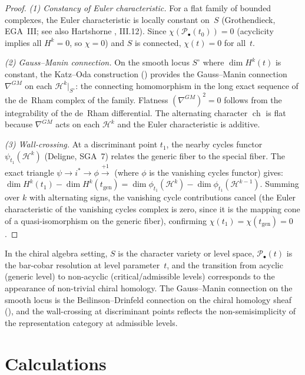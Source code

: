 \begin{proof}
\emph{(1) Constancy of Euler characteristic.}
For a flat family of bounded complexes, the Euler characteristic is
locally constant on~$S$ (Grothendieck, EGA~III; see also Hartshorne
\cite{Har77}, III.12). Since $\chi(\mathcal{P}_\bullet(t_0)) = 0$
(acyclicity implies all $H^k = 0$, so $\chi = 0$) and $S$ is connected,
$\chi(t) = 0$ for all~$t$.

\emph{(2) Gauss--Manin connection.}
On the smooth locus $S^{\circ}$ where $\dim H^k(t)$ is constant, the
Katz--Oda construction (\cite{KO68}) provides the Gauss--Manin connection
$\nabla^{GM}$ on each $\mathcal{H}^k|_{S^{\circ}}$: the connecting
homomorphism in the long exact sequence of the de~Rham complex of the
family. Flatness $(\nabla^{GM})^2 = 0$ follows from the integrability
of the de~Rham differential. The alternating character $\operatorname{ch}$
is flat because $\nabla^{GM}$ acts on each $\mathcal{H}^k$ and the
Euler characteristic is additive.

\emph{(3) Wall-crossing.}
At a discriminant point $t_1$, the nearby cycles functor
$\psi_{t_1}(\mathcal{H}^k)$ (Deligne, SGA~7) relates the generic fiber
to the special fiber. The exact triangle
$\psi \to i^* \to \phi \xrightarrow{+1}$ (where $\phi$ is the
vanishing cycles functor) gives:
$\dim H^k(t_1) - \dim H^k(t_{\mathrm{gen}})
= \dim \phi_{t_1}(\mathcal{H}^k) - \dim \phi_{t_1}(\mathcal{H}^{k-1})$.
Summing over $k$ with alternating signs, the vanishing cycle
contributions cancel (the Euler characteristic of the vanishing cycles
complex is zero, since it is the mapping cone of a quasi-isomorphism on
the generic fiber), confirming $\chi(t_1) = \chi(t_{\mathrm{gen}}) = 0$.
\end{proof}

\begin{remark}
In the chiral algebra setting, $S$ is the character variety or level space,
$\mathcal{P}_\bullet(t)$ is the bar-cobar resolution at level parameter~$t$,
and the transition from acyclic (generic level) to non-acyclic
(critical/admissible levels) corresponds to the appearance of non-trivial
chiral homology. The Gauss--Manin connection on the smooth locus is the
Beilinson--Drinfeld connection on the chiral homology sheaf (\cite{BD04}),
and the wall-crossing at discriminant points reflects the non-semisimplicity
of the representation category at admissible levels.
\end{remark}

\section{Calculations}\label{sec:module-calculations}

